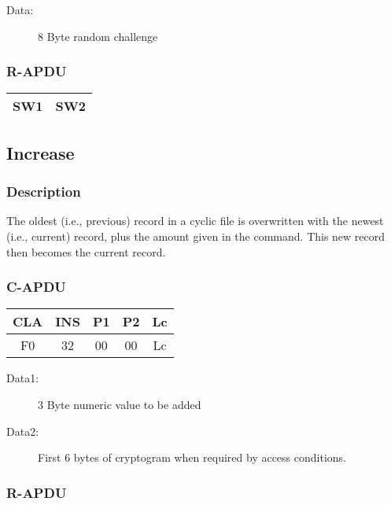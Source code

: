 \documentclass[a4paper,oneside]{article}
\begin{document}
\begin{description}
\item[Data:] 8 Byte random challenge
\end{description}

\subsubsection*{R-APDU}

\begin{tabular}{|c|c|} \hline
SW1 & SW2 \\ \hline
\end{tabular}


\subsection{Increase}

\subsubsection*{Description}

The oldest (i.e., previous) record in a cyclic file is overwritten
with the newest (i.e., current) record, plus the amount given in the
command. This new record then becomes the current record.

\subsubsection*{C-APDU}

\begin{tabular}{|c|c|c|c|c|} \hline
CLA & INS & P1 & P2 & Lc \\ \hline \hline
F0 & 32 & 00 & 00 & Lc \\ \hline
\end{tabular}

\begin{description}
\item[Data1:] 3 Byte numeric value to be added
\item[Data2:] First 6 bytes of cryptogram when required by access conditions.
\end{description}

\subsubsection*{R-APDU}
\end{document}
